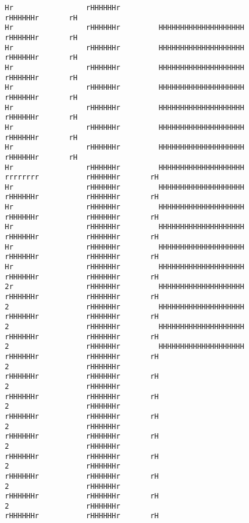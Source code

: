 \documentclass[10pt,a4paper]{article}
\begin{document}
{\begin{verbatim}
Hr                 rHHHHHHr                                                        rHHHHHHr       rH
Hr                 rHHHHHHr         HHHHHHHHHHHHHHHHHHHH                           rHHHHHHr       rH
Hr                 rHHHHHHr         HHHHHHHHHHHHHHHHHHHH                           rHHHHHHr       rH
Hr                 rHHHHHHr         HHHHHHHHHHHHHHHHHHHH                           rHHHHHHr       rH
Hr                 rHHHHHHr         HHHHHHHHHHHHHHHHHHHH                           rHHHHHHr       rH
Hr                 rHHHHHHr         HHHHHHHHHHHHHHHHHHHH                           rHHHHHHr       rH
Hr                 rHHHHHHr         HHHHHHHHHHHHHHHHHHHH                           rHHHHHHr       rH
Hr                 rHHHHHHr         HHHHHHHHHHHHHHHHHHHH                           rHHHHHHr       rH
Hr                 rHHHHHHr         HHHHHHHHHHHHHHHHHHHH        rrrrrrrr           rHHHHHHr       rH
Hr                 rHHHHHHr         HHHHHHHHHHHHHHHHHHHH        rHHHHHHr           rHHHHHHr       rH
Hr                 rHHHHHHr         HHHHHHHHHHHHHHHHHHHH        rHHHHHHr           rHHHHHHr       rH
Hr                 rHHHHHHr         HHHHHHHHHHHHHHHHHHHH        rHHHHHHr           rHHHHHHr       rH
Hr                 rHHHHHHr         HHHHHHHHHHHHHHHHHHHH        rHHHHHHr           rHHHHHHr       rH
Hr                 rHHHHHHr         HHHHHHHHHHHHHHHHHHHH        rHHHHHHr           rHHHHHHr       rH
2r                 rHHHHHHr         HHHHHHHHHHHHHHHHHHHH        rHHHHHHr           rHHHHHHr       rH
2                  rHHHHHHr         HHHHHHHHHHHHHHHHHHHH        rHHHHHHr           rHHHHHHr       rH
2                  rHHHHHHr         HHHHHHHHHHHHHHHHHHHH        rHHHHHHr           rHHHHHHr       rH
2                  rHHHHHHr         HHHHHHHHHHHHHHHHHHHH        rHHHHHHr           rHHHHHHr       rH
2                  rHHHHHHr                                     rHHHHHHr           rHHHHHHr       rH
2                  rHHHHHHr                                     rHHHHHHr           rHHHHHHr       rH
2                  rHHHHHHr                                     rHHHHHHr           rHHHHHHr       rH
2                  rHHHHHHr                                     rHHHHHHr           rHHHHHHr       rH
2                  rHHHHHHr                                     rHHHHHHr           rHHHHHHr       rH
2                  rHHHHHHr                                     rHHHHHHr           rHHHHHHr       rH
2                  rHHHHHHr                                     rHHHHHHr           rHHHHHHr       rH
2                  rHHHHHHr                                     rHHHHHHr           rHHHHHHr       rH

\end{verbatim}}
\end{document}
